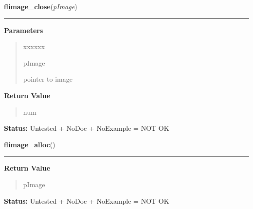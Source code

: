 \hspace{.8\funcindent}\begin{boxedminipage}{\funcwidth}

    \raggedright \textbf{flimage\_close}(\textit{pImage})

    \vspace{-1.5ex}

    \rule{\textwidth}{0.5\fboxrule}
\setlength{\parskip}{2ex}
\setlength{\parskip}{1ex}
      \textbf{Parameters}
      \vspace{-1ex}

      \begin{quote}
        \begin{Ventry}{xxxxxx}

          \item[pImage]

          pointer to image

        \end{Ventry}

      \end{quote}

      \textbf{Return Value}
    \vspace{-1ex}

      \begin{quote}
      num

      \end{quote}

\textbf{Status:} Untested + NoDoc + NoExample = NOT OK



    \end{boxedminipage}

    \label{xformslib:library:flimage_alloc}

    \vspace{0.5ex}

\hspace{.8\funcindent}\begin{boxedminipage}{\funcwidth}

    \raggedright \textbf{flimage\_alloc}()

    \vspace{-1.5ex}

    \rule{\textwidth}{0.5\fboxrule}
\setlength{\parskip}{2ex}
\setlength{\parskip}{1ex}
      \textbf{Return Value}
    \vspace{-1ex}

      \begin{quote}
      pImage

      \end{quote}

\textbf{Status:} Untested + NoDoc + NoExample = NOT OK



    \end{boxedminipage}

